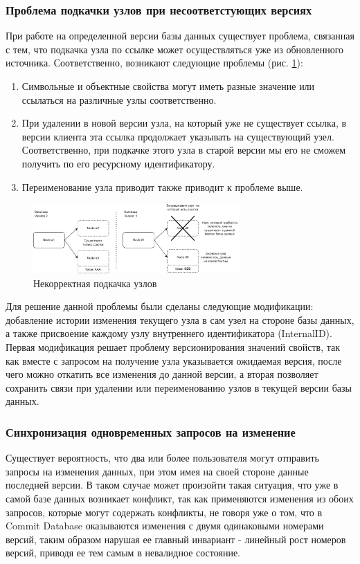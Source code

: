 \documentclass[12pt]{article}
\begin{document}
\subsubsection{Проблема подкачки узлов при несоответстующих версиях}
\qquad При работе на определенной версии базы данных существует проблема, связанная с тем, что подкачка узла по ссылке может осуществляться уже из обновленного источника. Соответственно, возникают следующие проблемы (рис. \ref{fig:noncorrect_node_pump}):

\begin{enumerate}
    \item Символьные и объектные свойства могут иметь разные значение или ссылаться на различные узлы соответственно.
    \item При удалении в новой версии узла, на который уже не существует ссылка, в версии клиента эта ссылка продолжает указывать на существующий узел. Соответственно, при подкачке этого узла в старой версии мы его не сможем получить по его ресурсному идентификатору.
    \item Переименование узла приводит также приводит к проблеме выше.
\end{enumerate}

\begin{figure}[!ht]
    \centering
    \includegraphics[width=0.7\textwidth]{_images/bad_node_pooling.png}
    \caption{Некорректная подкачка узлов}
    \label{fig:noncorrect_node_pump}
\end{figure}

Для решение данной проблемы были сделаны следующие модификации: добавление истории изменения текущего узла в сам узел на стороне базы данных, а также присвоение каждому узлу внутреннего идентификатора (InternalID). Первая модификация решает проблему версионирования значений свойств, так как вместе с запросом на получение узла указывается ожидаемая версия, после чего можно откатить все изменения до данной версии, а вторая позволяет сохранить связи при удалении или переименованию узлов в текущей версии базы данных.

\pagebreak

\subsubsection{Синхронизация одновременных запросов на изменение}
\qquad Существует вероятность, что два или более пользователя могут отправить запросы на изменения данных, при этом имея на своей стороне данные последней версии. В таком случае может произойти такая ситуация, что уже в самой базе данных возникает конфликт, так как применяются изменения из обоих запросов, которые могут содержать конфликты, не говоря уже о том, что в Commit Database оказываются изменения с двумя одинаковыми номерами версий, таким образом нарушая ее главный инвариант - линейный рост номеров версий, приводя ее тем самым в невалидное состояние.
\end{document}
